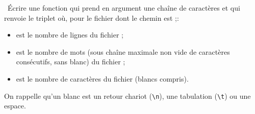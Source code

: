 \question\ \'Ecrire une fonction  qui prend en argument une chaîne de caractères  et qui renvoie le triplet  où, pour le fichier dont le chemin est  ;: 
    \begin{itemize}
      \item {} est le nombre de lignes du fichier ;
      \item {} est le nombre de mots (sous chaîne maximale non vide de caractères consécutifs, sans blanc)  du fichier  ;
      \item {} est le nombre de caractères  du fichier (blancs compris).
    \end{itemize}
On rappelle qu'un blanc est un retour chariot (\texttt{\textbackslash{}n}), une tabulation (\texttt{\textbackslash{}t}) ou une espace.
